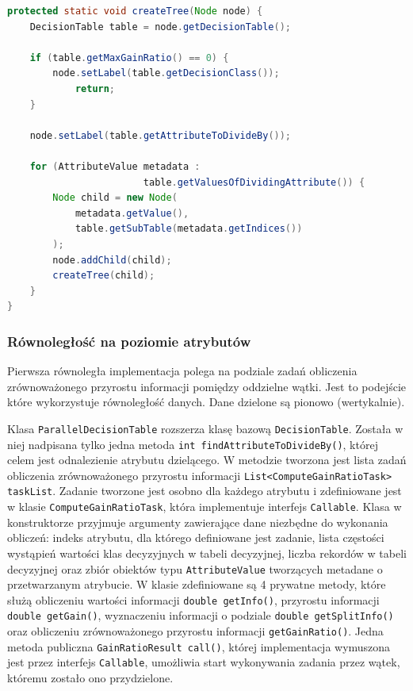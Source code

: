 \documentclass[12pt]{article}
\begin{document}
\begin{lstlisting}[language=java, caption=Rekurencyjne tworzenie drzewa decyzyjnego,frame=single,label={lst:sequential-tree}]
protected static void createTree(Node node) {
    DecisionTable table = node.getDecisionTable();

    if (table.getMaxGainRatio() == 0) {
        node.setLabel(table.getDecisionClass());
            return;
    }

    node.setLabel(table.getAttributeToDivideBy());

    for (AttributeValue metadata :
                        table.getValuesOfDividingAttribute()) {
        Node child = new Node(
            metadata.getValue(),
            table.getSubTable(metadata.getIndices())
        );
        node.addChild(child);
        createTree(child);
    }
}
\end{lstlisting}

\subsubsection{Równoległość na poziomie atrybutów}\label{executor-service}

Pierwsza równoległa implementacja polega na podziale zadań obliczenia zrównoważonego przyrostu informacji pomiędzy oddzielne wątki.
Jest to podejście które wykorzystuje równoległość danych. Dane dzielone są pionowo (wertykalnie).

Klasa \verb|ParallelDecisionTable| rozszerza klasę bazową \verb|DecisionTable|.
Została w niej nadpisana tylko jedna metoda \verb|int findAttributeToDivideBy()|, której celem jest odnalezienie atrybutu dzielącego.
W metodzie tworzona jest lista zadań obliczenia zrównoważonego przyrostu informacji \verb|List<ComputeGainRatioTask> taskList|.
Zadanie tworzone jest osobno dla każdego atrybutu i zdefiniowane jest w klasie \verb|ComputeGainRatioTask|, która implementuje interfejs \verb|Callable|.
Klasa w konstruktorze przyjmuje argumenty zawierające dane niezbędne do wykonania obliczeń:
indeks atrybutu, dla którego definiowane jest zadanie, lista częstości wystąpień
wartości klas decyzyjnych w tabeli decyzyjnej, liczba rekordów w tabeli decyzyjnej oraz zbiór obiektów typu \verb|AttributeValue|
tworzących metadane o przetwarzanym atrybucie. W klasie zdefiniowane są 4 prywatne metody, które służą obliczeniu wartości informacji \verb|double getInfo()|,
przyrostu informacji \verb|double getGain()|, wyznaczeniu informacji o podziale \verb|double getSplitInfo()|
oraz obliczeniu zrównoważonego przyrostu informacji \verb|getGainRatio()|. Jedna metoda publiczna \verb|GainRatioResult call()|, której
implementacja wymuszona jest przez interfejs \verb|Callable|, umożliwia start wykonywania zadania przez wątek, któremu zostało ono przydzielone.
\end{document}
